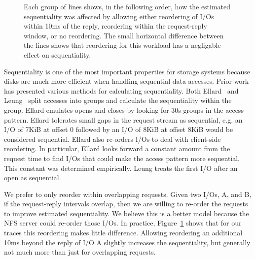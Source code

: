 \begin{figure*}
\caption{number of reads in a single group (more than 30s gap between I/Os); }
\label{fig:seq-analysis}
\end{figure*}

\begin{figure}
\caption{Each group of lines shows, in the following order, how the estimated sequentiality was
affected by allowing either reordering of I/Os within 10ms of the
reply, reordering within the request-reply window, or no reordering.
The small horizontal difference between the lines shows that reordering for
this workload has a negligable effect on sequentiality.}
\label{fig:seq-bytes-compare}
\end{figure}

Sequentiality is one of the most important properties for storage
systems because disks are much more efficient when handling sequential
data accesses.  Prior work has presented
various methods for calculating sequentiality.  Both
Ellard~\cite{EllardFast03} and Leung~\cite{LeungUsenix08} split accesses
into groups and calculate the sequentiality within the group.  Ellard
emulates opens and closes by looking for 30s groups in the access
pattern.  Ellard tolerates small gaps in the request stream as
sequential, e.g. an I/O of 7KiB at offset 0 followed by an I/O of 8KiB at
offset 8KiB would be considered sequential.  Ellard also re-orders I/Os
to deal with client-side reordering. In particular, Ellard looks
forward a constant amount from the request time to find I/Os that
could make the access pattern more sequential.  This constant was
determined empirically.  Leung treats the first I/O after an open as
sequential.

We prefer to only reorder within overlapping requests. Given two I/Os,
A, and B, if the request-reply intervals overlap, then we are willing
to re-order the requests to improve estimated sequentiality.  We
believe this is a better model because the NFS server could 
re-order those I/Os.  In practice,
Figure~\ref{fig:seq-bytes-compare} shows that for our traces this
reordering makes little difference.  Allowing reordering an additional
10ms beyond the reply of I/O A slightly increases the sequentiality,
but generally not much more than just for overlapping requests.

